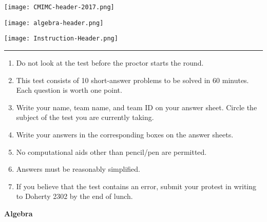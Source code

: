 \documentclass[10pt]{article}
\begin{document}
\thispagestyle{empty}
\begin{center}

\vspace*{90pt}

\texttt{[image: CMIMC-header-2017.png]}

\texttt{[image: algebra-header.png]}

\vspace{1.6in}

\texttt{[image: Instruction-Header.png]}
\noindent\rule{17.7cm}{2pt}
\end{center}

\vspace{10pt}

\begin{enumerate}
\large
\item Do not look at the test before the proctor starts the round.

\item This test consists of 10 short-answer problems to be solved in 60 minutes.
	Each question is worth one point.

\item Write your name, team name, and team ID on your answer sheet. Circle the
	subject of the test you are currently taking.

\item Write your answers in the corresponding boxes on the answer sheets.

\item No computational aids other than pencil/pen are permitted.

\item Answers must be reasonably simplified. 

\item If you believe that the test contains an error, submit your protest in writing to Doherty 2302 by the end of lunch.
\end{enumerate}
\newpage

\begin{center}
\huge\textbf{Algebra}\normalsize

\vspace{3pt}
\end{center}
\end{document}
